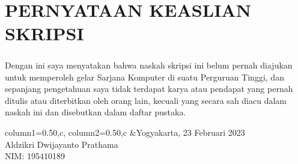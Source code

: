 \documentclass[../SKRIPSI_ALDZIKRI_DWIJAYANTO_PRATHAMA.tex]{subfiles}
\begin{document}
\setcounter{page}{4}
\chapter*{PERNYATAAN KEASLIAN SKRIPSI}
\begin{doublespace}
\paragraph*{}Dengan ini saya menyatakan bahwa naskah skripsi
ini belum pernah diajukan untuk memperoleh gelar Sarjana
Komputer di suatu Perguruan Tinggi, dan sepanjang
pengetahuan saya tidak terdapat karya atau pendapat yang
pernah ditulis atau diterbitkan oleh orang lain, kecuali
yang secara sah diacu dalam naskah ini dan disebutkan dalam
daftar pustaka.\\
\end{doublespace}
\vspace*{1cm}
\begin{tblr}{column{1}={0.50\linewidth,c},
column{2}={0.50\linewidth,c}}
  &{Yogyakarta, 23 Februari 2023\\
    \vspace*{3cm}
    Aldzikri Dwijayanto Prathama\\
    NIM: 195410189}
\end{tblr}
\end{document}
